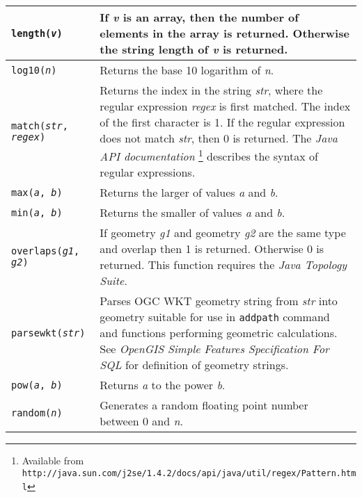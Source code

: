 \begin{longtable}{|p{5cm}|p{7cm}|}
\texttt{length(\textit{v})} &
If \textit{v} is an array, then the number of elements in the
array is returned.  Otherwise the string length of \textit{v} is returned. \\

\hline

\texttt{log10(\textit{n})} &
Returns the base 10 logarithm of \textit{n}. \\

\hline

\texttt{match(\textit{str}, \textit{regex})} &
Returns the index in the string \textit{str}, where the regular expression
\textit{regex} is first matched.  The index of the first character is 1.
If the regular expression does not match \textit{str}, then 0 is returned.
The \textit{Java API documentation}
\footnote{Available from
\texttt{http://java.sun.com/j2se/1.4.2/docs/api/java/util/regex/Pattern.html}}
describes the syntax of regular expressions. \\

\hline

\texttt{max(\textit{a}, \textit{b})} &
Returns the larger of values \textit{a} and \textit{b}. \\

\hline

\texttt{min(\textit{a}, \textit{b})} &
Returns the smaller of values \textit{a} and \textit{b}. \\

\hline

\texttt{overlaps(\textit{g1}, \textit{g2})} &
If geometry \textit{g1} and geometry \textit{g2}
are the same type
and overlap
then 1 is returned.  Otherwise 0 is returned.
This function requires the \textit{Java Topology Suite}. \\

\hline

\texttt{parsewkt(\textit{str})} &
Parses OGC WKT geometry string from \textit{str}
into geometry suitable for use
in \texttt{addpath} command and functions performing geometric calculations.
See
\textit{OpenGIS Simple Features Specification For SQL}
for definition of geometry strings. \\

\hline

\texttt{pow(\textit{a}, \textit{b})} &
Returns \textit{a} to the power \textit{b}. \\

\hline

\texttt{random(\textit{n})} &
Generates a random floating point number between 0 and \textit{n}. \\


\end{longtable}
